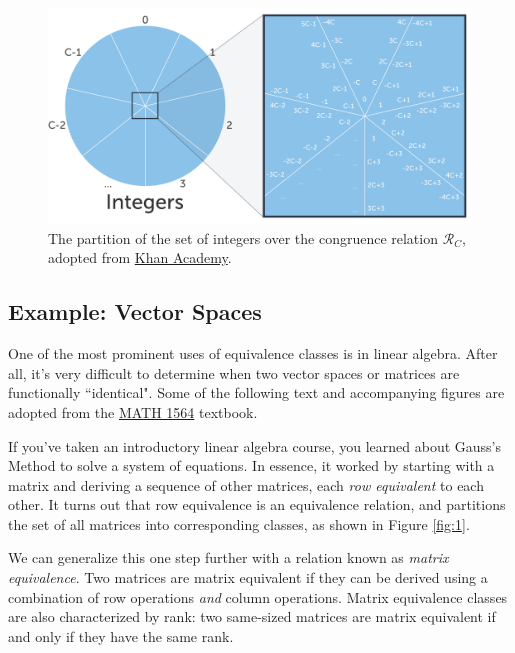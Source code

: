 \documentclass{article}
\begin{document}
        \begin{figure}[htbp]
            \centering
            \captionsetup{width=.8\linewidth}
            \includegraphics[scale = .4]{sp23/hw-supplements/hw5-supp/images/congruence_classes.png}
            \caption{The partition of the set of integers over the congruence relation $\mathcal{R}_{C}$, adopted from \href{https://www.khanacademy.org/computing/computer-science/cryptography/modarithmetic/a/congruence-modulo}{Khan Academy}.}
            \label{fig:congruency_classes}
        \end{figure}
        
    \subsection*{Example: Vector Spaces}
        One of the most prominent uses of equivalence classes is in linear algebra. After all, it's very difficult to determine when two vector spaces or matrices are functionally ``identical". Some of the following text and accompanying figures are adopted from the \href{https://hefferon.net/linearalgebra/}{MATH 1564} textbook.

        \vspace{3mm}
        If you've taken an introductory linear algebra course, you learned about Gauss's Method to solve a system of equations. In essence, it worked by starting with a matrix and deriving a sequence of other matrices, each \textit{row equivalent} to each other. It turns out that row equivalence is an equivalence relation, and partitions the set of all matrices into corresponding classes, as shown in Figure \ref*{fig:1}.

        \vspace{3mm}
        We can generalize this one step further with a relation known as \textit{matrix equivalence}. Two matrices are matrix equivalent if they can be derived using a combination of row operations \textit{and} column operations. Matrix equivalence classes are also characterized by rank: two same-sized matrices are matrix equivalent if and only if they have the same rank.
        
\end{document}
